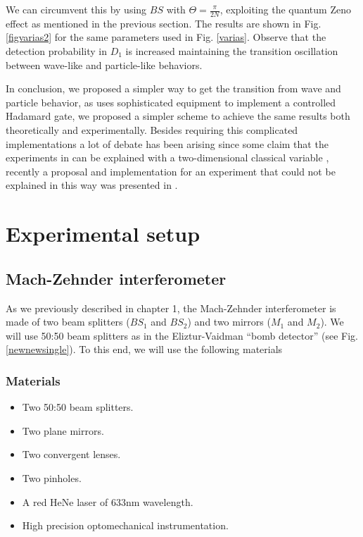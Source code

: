 \documentclass[12pt]{book}
\newcommand\blankpage{
    \null
    \thispagestyle{empty}
    \addtocounter{page}{0}
    \newpage
    }
\begin{document}
We can circumvent this by using $BS$ with $\Theta=\frac{\pi}{2N}$, exploiting the quantum Zeno effect as mentioned in the previous section. The results are shown in Fig. \ref{figvarias2} for the same parameters used in Fig. \ref{varias}. Observe that the detection probability in $D_{1}$ is increased maintaining the transition oscillation between wave-like and particle-like behaviors.
                  



In conclusion, we proposed a simpler way to get the transition from wave and particle behavior, as \cite{Kaiser2012,Peruzzo} uses sophisticated equipment to implement a controlled Hadamard gate, we proposed a simpler scheme to achieve the same results both theoretically and experimentally. Besides requiring this complicated implementations a lot of debate has been arising since some claim that the experiments in \cite{Peruzzo,Kaiser2012}  can be explained with a two-dimensional classical variable \cite{Rossi,Chaves}, recently a proposal and implementation for an experiment that could not be explained in this way was presented in \cite{Polino}.
\pagebreak
\blankpage


\chapter{Experimental setup}


\section{Mach-Zehnder interferometer}

As we previously described in chapter 1, the Mach-Zehnder interferometer is made of two beam splitters ($BS_{1}$ and $BS_{2}$) and two mirrors ($M_{1}$ and $M_{2}$). We will use 50:50 beam splitters as in the Eliztur-Vaidman ``bomb detector'' (see Fig. \ref{newnewsingle}). To this end, we will use the following materials

\subsection{Materials}
\begin{itemize}
\item Two 50:50 beam splitters.
\item Two plane mirrors.
\item Two convergent lenses.
\item Two pinholes.
\item A red HeNe laser of 633nm wavelength.
\item High precision optomechanical instrumentation.
\end{itemize}
\end{document}

